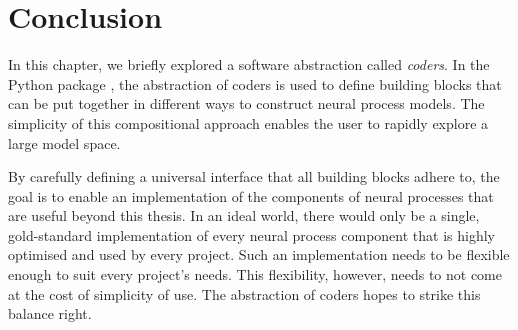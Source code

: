 \documentclass[12pt, twoside]{report}
\begin{document}
\section{Conclusion}
\label{sec:software:conclusion}
In this chapter, we briefly explored a software abstraction called \emph{coders}.
In the Python package , the abstraction of coders is used to define building blocks
that can be put together in different ways to construct neural process models.
The simplicity of this compositional approach enables the user to rapidly explore a large model space.

By carefully defining a universal interface that all building blocks adhere to, the goal is to enable an implementation of the components of neural processes that are useful beyond this thesis.
In an ideal world, there would only be a single, gold-standard implementation of every neural process component that is highly optimised and used by every project.
Such an implementation needs to be flexible enough to suit every project's needs.
This flexibility, however, needs to not come at the cost of simplicity of use.
The abstraction of coders hopes to strike this balance right.
\end{document}
